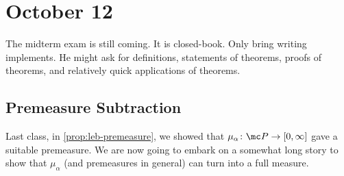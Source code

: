 \documentclass[../notes.tex]{subfiles}
\begin{document}
\section{October 12}

The midterm exam is still coming. It is closed-book. Only bring writing implements. He might ask for definitions, statements of theorems, proofs of theorems, and relatively quick applications of theorems.

\subsection{Premeasure Subtraction}
Last class, in \autoref{prop:leb-premeasure}, we showed that $\mu_\alpha\colon\mc P\to[0,\infty]$ gave a suitable premeasure. We are now going to embark on a somewhat long story to show that $\mu_\alpha$ (and premeasures in general) can turn into a full measure.
\end{document}
